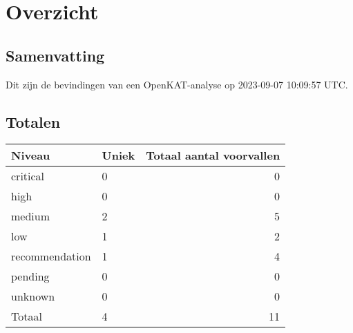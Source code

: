 \documentclass[11pt, a4paper]{report}
\begin{document}
\newpage

\chapter{Overzicht}

\section{Samenvatting}
Dit zijn de bevindingen van een OpenKAT-analyse op 2023-09-07 10:09:57 UTC. %

\bgroup{}
\def\arraystretch{1.2}
\section{Totalen}
\begin{tabular}{ llr }
	Niveau & Uniek & Totaal aantal voorvallen \\\toprule
	\toprule

		\colorbox{box-color-critical}{ \color{color-critical} critical } & 0 & 0 \\

		\colorbox{box-color-high}{ \color{color-high} high } & 0 & 0 \\

		\colorbox{box-color-medium}{ \color{color-medium} medium } & 2 & 5 \\

		\colorbox{box-color-low}{ \color{color-low} low } & 1 & 2 \\

		\colorbox{box-color-recommendation}{ \color{color-recommendation} recommendation } & 1 & 4 \\

		\colorbox{box-color-pending}{ \color{color-pending} pending } & 0 & 0 \\

		\colorbox{box-color-unknown}{ \color{color-unknown} unknown } & 0 & 0 \\

	\bottomrule
	Totaal & 4 & 11
\end{tabular}
\egroup{}

\bgroup{}
\def\arraystretch{1.2}
\end{document}
